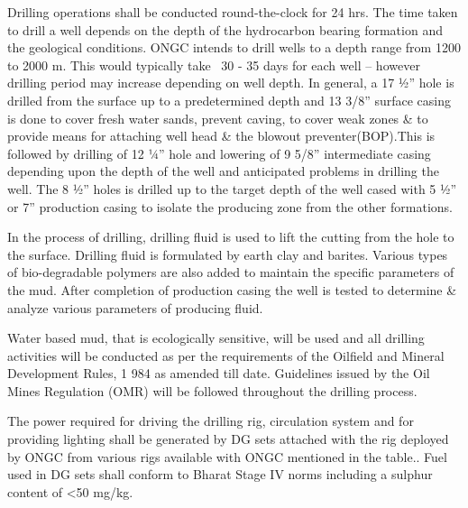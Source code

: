 Drilling operations shall be conducted round-the-clock for 24 hrs. The time taken to drill a
 well depends on the depth of the hydrocarbon bearing formation and the geological conditions.
 ONGC intends to drill wells to a depth range from 1200 to 2000 m. This would typically take ~30 - 35 days
  for each well – however drilling period may increase depending on well depth.
  In general, a 17 1⁄2” hole is drilled from the surface up to a predetermined depth and 13 3/8” surface casing is done to cover fresh water sands, prevent caving, to cover weak zones \& to provide means for attaching well head \& the blowout preventer(BOP).This is followed by drilling of 12 1⁄4” hole and lowering of 9 5/8” intermediate casing depending upon the depth of the well and anticipated problems in drilling the well. The 8 1⁄2” holes is drilled up to the target depth of the well cased with 5 1⁄2” or 7” production casing to isolate the producing zone from the other formations.

\vspace{1em}

In the process of drilling, drilling fluid is used to lift the cutting from the hole to the surface.
Drilling fluid is formulated by earth clay and barites. Various types of bio-degradable polymers are
also added to maintain the specific parameters of the mud. After completion of production casing
the well is tested to determine \& analyze various parameters of producing fluid.

\vspace{1em}

Water based mud, that is ecologically sensitive, will be used and all drilling activities will
be conducted as per the requirements of the Oilfield and Mineral Development Rules, 1
984 as amended till date. Guidelines issued by the Oil Mines Regulation (OMR) will be followed
throughout the drilling process.

\vspace{1em}
The power required for driving the drilling rig, circulation system and for providing lighting
shall be generated by DG sets attached with the rig deployed by ONGC from various
rigs available with ONGC mentioned in the table.. Fuel used in DG sets shall conform to
Bharat Stage IV norms including a sulphur content of <50 mg/kg.


